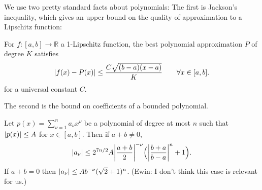 \documentclass{article}
\theoremstyle{definition}
\DeclarePairedDelimiter{\abs}{\lvert}{\rvert}
\begin{document}
We use two pretty standard facts about polynomials:
The first is Jackson's inequality, which gives an upper bound on the quality of approximation to a Lipschitz function:
\begin{lemma} \label{lem:jackson}
    For $f: [a, b] \to \mathbb{R}$ a 1-Lipschitz function, the best polynomial approximation $P$ of degree $K$ satisfies
    \begin{align*}
        \abs{f(x) - P(x)} \leq \frac{C\sqrt{(b-a)(x-a)}}{K} \qquad \forall x \in [a,b].
    \end{align*}
    for a universal constant $C$.
\end{lemma}
The second is the bound on coefficients of a bounded polynomial.
\begin{lemma} \label{lem:coefs}
    Let $p(x) = \sum_{\nu=1}^n a_\nu x^\nu$ be a polynomial of degree at most $n$ such that $\abs{p(x)} \leq A$ for $x \in [a,b]$.
    Then if $a + b \neq 0$,
    \begin{align*}
        \abs{a_\nu} \leq 2^{7n/2}A\abs*{\frac{a+b}{2}}^{-\nu}\Big(\abs*{\frac{b+a}{b-a}}^n + 1\Big).
    \end{align*}
    If $a + b = 0$ then $\abs{a_\nu} \leq Ab^{-\nu}(\sqrt{2}+1)^n$. (Ewin: I don't think this case is relevant for us.)
\end{lemma}
\end{document}
